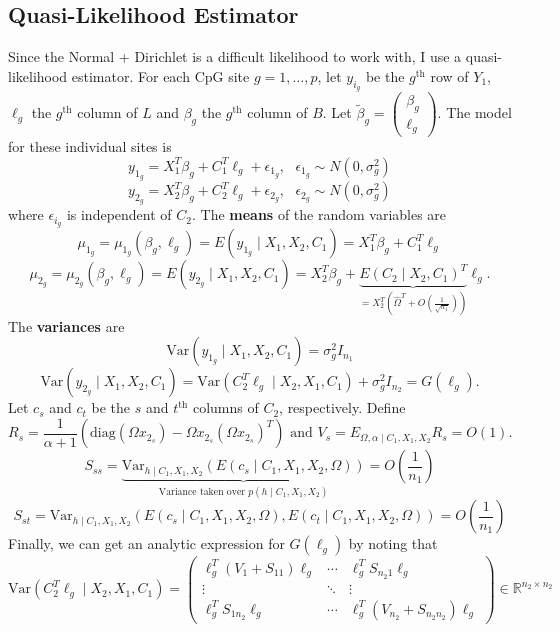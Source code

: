 \documentclass{article}
\begin{document}
\subsection{Quasi-Likelihood Estimator}
Since the Normal + Dirichlet is a difficult likelihood to work with, I use a quasi-likelihood estimator. For each CpG site $g = 1, \ldots, p$, let $y_{i_g}$ be the $g^{\text{th}}$ row of $Y_1$, $\ell_g$ the $g^{\text{th}}$ column of $L$ and $\beta_g$ the $g^{\text{th}}$ column of $B$. Let $\tilde{\beta}_g = \left( \begin{matrix}
\beta_g\\
\ell_g
\end{matrix} \right)$. The model for these individual sites is
\[
y_{1_g} = X_1^T \beta_g + C_1^T \ell_g + \epsilon_{1_g}, \text{ } \epsilon_{1_g} \sim N\left( 0, \sigma_g^2 \right)
\]
\[
y_{2_g} = X_2^T \beta_g + C_2^T \ell_g + \epsilon_{2_g}, \text{ } \epsilon_{2_g} \sim N\left( 0, \sigma_g^2 \right)
\]
where $\epsilon_{i_g}$ is independent of $C_2$. The \textbf{means} of the random variables are
\[
\mu_{1_g} = \mu_{1_g}\left( \beta_g, \ell_g \right) = E\left( y_{1_g} \mid X_1, X_2, C_1 \right) = X_1^T \beta_g + C_1^T \ell_g
\]
\[
\mu_{2_g} = \mu_{2_g}\left( \beta_g, \ell_g \right) = E\left( y_{2_g} \mid X_1, X_2, C_1 \right) = X_2^T \beta_g + \underbrace{E\left( C_2 \mid X_2, C_1 \right)^T}_{= X_2^T\left( \hat{\Omega}^T + O\left( \frac{1}{\sqrt{n_1}} \right) \right)} \ell_g.
\]
The \textbf{variances} are
\[
\text{Var}\left( y_{1_g} \mid X_1, X_2, C_1 \right) = \sigma_g^2 I_{n_1}
\]
\[
\text{Var}\left( y_{2_g} \mid X_1, X_2, C_1 \right) = \text{Var}\left( C_2^T \ell_g \mid X_2, X_1, C_1 \right) + \sigma_g^2 I_{n_2} = G\left( \ell_g \right).
\]
Let $c_s$ and $c_t$ be the $s$ and $t^{\text{th}}$ columns of $C_2$, respectively. Define
\[
R_s = \frac{1}{\alpha + 1}\left( \text{diag}\left( \Omega x_{2_s} \right) - \Omega x_{2_s} \left( \Omega x_{2_s} \right)^T \right) \text{ and } V_s = E_{\Omega, \alpha \mid C_1, X_1, X_2}R_s = O\left( 1 \right).
\]
\[
S_{ss} = \underbrace{\text{Var}_{h\mid C_1, X_1, X_2}\left( E\left( c_s \mid C_1, X_1, X_2, \Omega \right) \right)}_{\text{Variance taken over $p\left( h \mid C_1, X_1, X_2 \right)$}} = O\left( \frac{1}{n_1} \right)
\]
\[
S_{st} = \text{Var}_{h\mid C_1, X_1, X_2} \left( E\left( c_s \mid C_1, X_1, X_2, \Omega \right), E\left( c_t \mid C_1, X_1, X_2, \Omega \right) \right) = O\left( \frac{1}{n_1} \right)
\]
Finally, we can get an analytic expression for $G(\ell_g)$ by noting that
\[
\text{Var}\left( C_2^T \ell_g \mid X_2, X_1, C_1 \right) = \left( \begin{matrix}
\ell_g^T \left( V_1 + S_{11} \right) \ell_g & \cdots & \ell_g^T S_{n_2 1} \ell_g\\
\vdots & \ddots & \vdots\\
\ell_g^T S_{1 n_2} \ell_g & \cdots & \ell_g^T \left( V_{n_2} + S_{n_2n_2} \right) \ell_g
\end{matrix} \right) \in \mathbb{R}^{n_2 \times n_2}
\]
\end{document}
